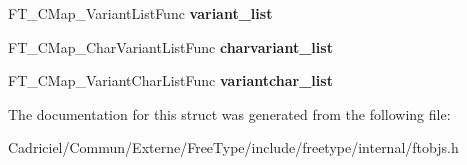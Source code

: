 \begin{DoxyCompactItemize}
\item 
\hypertarget{struct_f_t___c_map___class_rec___ad61635444cbfc71c4259e74cb892c172}{F\-T\-\_\-\-C\-Map\-\_\-\-Variant\-List\-Func {\bfseries variant\-\_\-list}}\label{struct_f_t___c_map___class_rec___ad61635444cbfc71c4259e74cb892c172}

\item 
\hypertarget{struct_f_t___c_map___class_rec___a65db9dfa0e29b7de257dc8870532ab19}{F\-T\-\_\-\-C\-Map\-\_\-\-Char\-Variant\-List\-Func {\bfseries charvariant\-\_\-list}}\label{struct_f_t___c_map___class_rec___a65db9dfa0e29b7de257dc8870532ab19}

\item 
\hypertarget{struct_f_t___c_map___class_rec___ac1563590a0bac99082aa0996b94aad57}{F\-T\-\_\-\-C\-Map\-\_\-\-Variant\-Char\-List\-Func {\bfseries variantchar\-\_\-list}}\label{struct_f_t___c_map___class_rec___ac1563590a0bac99082aa0996b94aad57}

\end{DoxyCompactItemize}


The documentation for this struct was generated from the following file\-:\begin{DoxyCompactItemize}
\item 
Cadriciel/\-Commun/\-Externe/\-Free\-Type/include/freetype/internal/ftobjs.\-h\end{DoxyCompactItemize}
